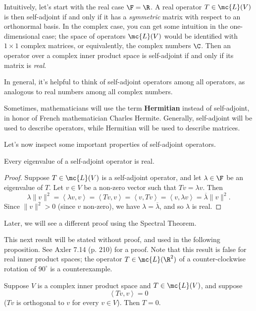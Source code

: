 \documentclass[math0540-lecture-notes.tex]{subfiles}
\begin{document}
Intuitively, let's start with the real case $\F=\R$. A real operator $T\in \mc{L}(V)$ is then
self-adjoint if and only if it has a \textit{symmetric} matrix with respect to an orthonormal basis.
In the complex case, you can get some intuition in the one-dimensional case; the space of operators
$\mc{L}(V)$ would be identified with $1\times 1$ complex matrices, or equivalently, the complex
numbers $\C$. Then an operator over a complex inner product space is self-adjoint if and only if its
matrix is \textit{real}.

In general, it's helpful to think of self-adjoint operators among all operators, as analogous to
real numbers among all complex numbers.

\begin{remark}
  Sometimes, mathematicians will use the term \textbf{Hermitian} instead of self-adjoint, in honor
  of French mathematician Charles Hermite. Generally, self-adjoint will be used to describe
  operators, while Hermitian will be used to describe matrices.
\end{remark}

Let's now inspect some important properties of self-adjoint operators.
\begin{proposition}{}
  Every eigenvalue of a self-adjoint operator is real.
\end{proposition}
\begin{proof}[Proof]
  Suppose $T\in \mc{L}(V)$ is a self-adjoint operator, and let $\lambda\in \F$ be an eigenvalue of
  $T$. Let $v\in V$ be a non-zero vector such that $Tv=\lambda v$. Then \[
    \lambda\|v\|^2=\left<\lambda v,v \right> =\left< Tv,v\right> =\left<v,Tv \right>
    =\left<v,\lambda v \right> =\overline{\lambda}\|v\|^2
  .\] Since $\|v\|^2>0$ (since $v$ non-zero), we have $\lambda=\overline{\lambda}$, and so $\lambda$
  is real.
\end{proof}
Later, we will see a different proof using the Spectral Theorem.

This next result will be stated without proof, and used in the following proposition. See Axler 7.14
(p. 210) for a proof. Note that this result is false for real inner product spaces; the operator
$T\in \mc{L}(\R^2)$ of a counter-clockwise rotation of $90^{\circ}$ is a counterexample.
\begin{proposition}{}
  Suppose $V$ is a complex inner product space and $T\in \mc{L}(V)$, and suppose \[
    \left<Tv,v \right> =0
  \] ($Tv$ is orthogonal to $v$ for every $v\in V$). Then $T=0$.
\end{proposition}
\end{document}
